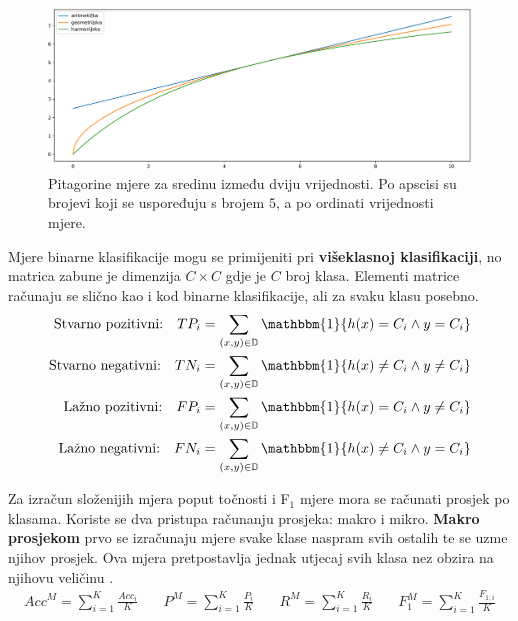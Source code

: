 \documentclass[times, utf8, numeric, diplomski]{fer}
\def\F1{F$_1$}
\begin{document}
\begin{figure}[h]
\includegraphics[width=.9\textwidth]{Pitagorine_sredine.pdf}
\centering
\caption{Pitagorine mjere za sredinu između dviju vrijednosti. Po apscisi su brojevi koji se uspoređuju s brojem $5$, a po ordinati vrijednosti mjere.}
\label{fig:sredine}
\end{figure}

Mjere binarne klasifikacije mogu se primijeniti pri \textbf{višeklasnoj klasifikaciji}, no matrica zabune je dimenzija $C\times C$ gdje je $C$ broj klasa. Elementi matrice računaju se slično kao i kod binarne klasifikacije, ali za svaku klasu posebno.
\begin{align}
\label{eq:true_groups}
\begin{split}
\text{Stvarno pozitivni:} \quad TP_i &= \sum_{(x,y)\in\mathbb{D}} \mathbbm{1} \{h(x) =  C_i \wedge y = C_i \} \\
\text{Stvarno negativni:} \quad TN_i &= \sum_{(x,y)\in\mathbb{D}} \mathbbm{1} \{h(x) \neq C_i \wedge y \neq C_i \} \\
\text{Lažno pozitivni:} \quad FP_i &= \sum_{(x,y)\in\mathbb{D}} \mathbbm{1} \{h(x) = C_i \wedge y \neq C_i \} \\
\text{Lažno negativni:} \quad FN_i &= \sum_{(x,y)\in\mathbb{D}} \mathbbm{1} \{h(x) \neq C_i \wedge y = C_i \}
\end{split}
\end{align}

Za izračun složenijih mjera poput točnosti i \F1 mjere mora se računati prosjek po klasama. Koriste se dva pristupa računanju prosjeka: makro i mikro. \textbf{Makro prosjekom} prvo se izračunaju mjere svake klase naspram svih ostalih te se uzme njihov prosjek. Ova mjera pretpostavlja jednak utjecaj svih klasa nez obzira na njihovu veličinu \citep{ml_probabilistic}.
\begin{equation}
\begin{split}
Acc^M = \sum_{i=1}^K \frac{Acc_i}{K}
\end{split} \quad
\begin{split}
P^M = \sum_{i=1}^K \frac{P_i}{K}
\end{split} \quad
\begin{split}
R^M = \sum_{i=1}^K \frac{R_i}{K}
\end{split} \quad
\begin{split}
F_1^M = \sum_{i=1}^K \frac{F_{1;i}}{K}
\end{split}
\end{equation}
\end{document}
